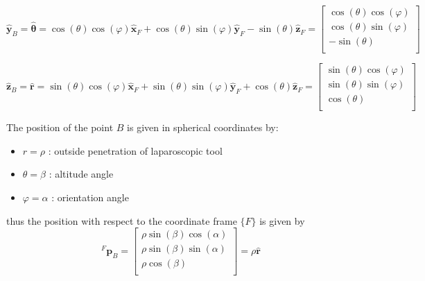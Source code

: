 \begin{equation}
\hat{\mathbf{y}}^{}_B = \hat{\mathbf{θ}} = \cos(θ)\cos(φ)\hat{\mathbf{x}}^{}_F + \cos(θ)\sin(φ)\hat{\mathbf{y}}^{}_F - \sin(θ)\hat{\mathbf{z}}^{}_F
= \begin{bmatrix}
\cos(θ)\cos(φ) \\
\cos(θ)\sin(φ) \\
- \sin(θ) \\
\end{bmatrix}
\end{equation}

\begin{equation}
\hat{\mathbf{z}}^{}_B = \hat{\mathbf{r}} = \sin(θ)\cos(φ)\hat{\mathbf{x}}^{}_F + \sin(θ)\sin(φ)\hat{\mathbf{y}}^{}_F + \cos(θ)\hat{\mathbf{z}}^{}_F
= \begin{bmatrix}
\sin(θ)\cos(φ) \\
\sin(θ)\sin(φ) \\
\cos(θ) \\
\end{bmatrix}
\end{equation}

The position of the point $B$ is given in spherical coordinates by:
\begin{itemize}
	\item $r=ρ$ : outside penetration of laparoscopic tool
	\item $θ=β$ : altitude angle
	\item $φ=α$ : orientation angle
\end{itemize}
thus the position with respect to the coordinate frame $\lbrace F \rbrace$ is given by
\begin{equation}
{}^{F}\mathbf{p}^{}_B = \begin{bmatrix}
ρ\sin(β)\cos(α) \\
ρ\sin(β)\sin(α) \\
ρ\cos(β) \\
\end{bmatrix} = ρ \hat{\mathbf{r}}
\end{equation}


